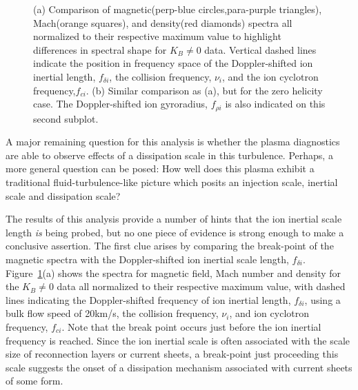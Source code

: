 \documentclass[manuscript]{aastex}
\begin{document}
\begin{figure}
\caption{\label{fig:BMD_comp} (a) Comparison of magnetic(perp-blue circles,para-purple triangles), Mach(orange squares), and density(red diamonds) spectra all normalized to their respective maximum value to highlight differences in spectral shape for $K_{B}\neq 0$ data. Vertical dashed lines indicate the position in frequency space of the Doppler-shifted ion inertial length, $f_{\delta i}$, the collision frequency, $\nu_i$, and the ion cyclotron frequency,$f_{ci}$. (b) Similar comparison as (a), but for the zero helicity case. The Doppler-shifted ion gyroradius, $f_{\rho i}$ is also indicated on this second subplot.}
\end{figure}

A major remaining question for this analysis is whether the plasma diagnostics are able to observe effects of a dissipation scale in this turbulence. Perhaps, a more general question can be posed: How well does this plasma exhibit a traditional fluid-turbulence-like picture which posits an injection scale, inertial scale and dissipation scale?

The results of this analysis provide a number of hints that the ion inertial scale length {\it is} being probed, but no one piece of evidence is strong enough to make a conclusive assertion. The first clue arises by comparing the break-point of the magnetic spectra with the Doppler-shifted ion inertial scale length, $f_{\delta i}$. Figure~\ref{fig:BMD_comp}(a) shows the spectra for magnetic field, Mach number and density for the $K_{B}\neq 0$ data all normalized to their respective maximum value, with dashed lines indicating the Doppler-shifted frequency of ion inertial length, $f_{\delta i}$, using a bulk flow speed of 20km/s, the collision frequency, $\nu_{i}$, and ion cyclotron frequency, $f_{ci}$. Note that the break point occurs just before the ion inertial frequency is reached. Since the ion inertial scale is often associated with the scale size of reconnection layers or current sheets, a break-point just proceeding this scale suggests the onset of a dissipation mechanism associated with current sheets of some form.
\end{document}
